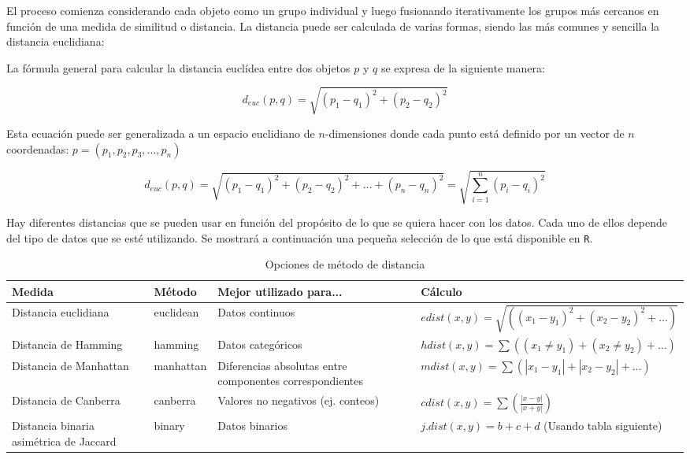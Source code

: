 El proceso comienza considerando cada objeto como un grupo individual y luego fusionando iterativamente los grupos más cercanos en función de una medida de similitud o distancia. La distancia puede ser calculada de varias formas, siendo las más comunes y sencilla la distancia euclidiana: 

La fórmula general para calcular la distancia euclídea entre dos objetos \(p\) y \(q\) se expresa de la siguiente manera:

\[
d_{euc}(p,q) = \sqrt{(p_{1} - q_{1})^2 + (p_{2} - q_{2})^2}
\]

Esta ecuación puede ser generalizada a un espacio euclidiano de \(n\)-dimensiones donde cada punto está definido por un vector de \(n\) coordenadas: \(p = (p_{1},p_{2},p_{3},...,p_{n})\)

\[
d_{euc}(p,q) = \sqrt{(p_{1} - q_{1})^2 + (p_{2} - q_{2})^2 + \ldots + (p_{n} - q_{n})^2} = \sqrt{\sum_{i=1}^{n}(p_{i} - q_{i})^2}
\]

Hay diferentes distancias que se pueden usar en función del propósito de lo que se quiera hacer con los datos. Cada uno de ellos depende del tipo de datos que se esté utilizando. Se mostrará a continuación una pequeña selección de lo que está disponible en \texttt{R}.
\begin{table}[H]
    \centering
    \caption{Opciones de método de distancia}
    \begin{tabular}{|p{3cm}|p{2.5cm}|p{4.5cm}|p{6cm}|}
    \hline
    \textbf{Medida} & \textbf{Método} & \textbf{Mejor utilizado para...} & \textbf{Cálculo} \\
    \hline
    Distancia euclidiana & euclidean & Datos continuos & \(edist(x, y) = \sqrt{((x_1 - y_1)^2 + (x_2 - y_2)^2 + \ldots)}\) \\
    \hline
    Distancia de Hamming & hamming & Datos categóricos & \(hdist(x, y) = \sum((x_1 \neq y_1) + (x_2 \neq y_2) + \ldots)\) \\
    \hline
    Distancia de Manhattan & manhattan & Diferencias absolutas entre componentes correspondientes & \(mdist(x, y) = \sum(|x_1 - y_1| + |x_2 - y_2| + \ldots)\) \\
    \hline
    Distancia de Canberra & canberra & Valores no negativos (ej. conteos) & \(cdist(x, y) = \sum\left(\frac{|x - y|}{|x + y|}\right)\) \\
    \hline
    Distancia binaria asimétrica de Jaccard & binary & Datos binarios & \(j.dist(x, y) = b + c + d\) (Usando tabla siguiente) \\
    \hline
    \end{tabular}
\end{table}

